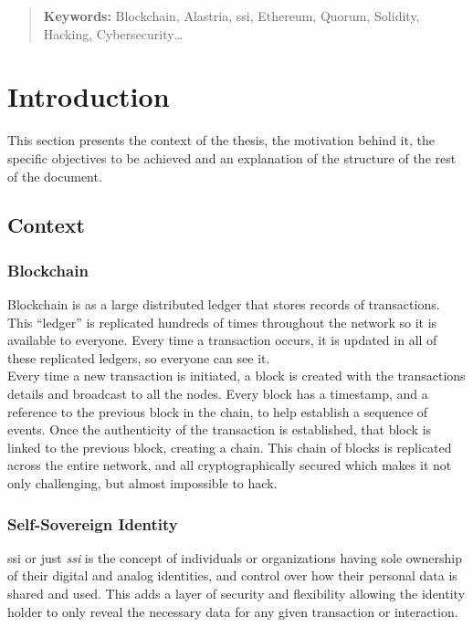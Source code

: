 \documentclass[a4paper, 12pt]{article} %
\begin{document}
\newpage

\begin{abstract}
    \normalsize
    
    \textbf{Keywords:} Blockchain, Alastria, \acrlong{ssi}, Ethereum, Quorum, Solidity, Hacking, Cybersecurity\ldots
\end{abstract}

\newpage
{} %

\section{Introduction}
    This section presents the context of the thesis, the motivation behind it, the specific objectives to be achieved and an explanation of the structure of the rest of the document.
    
    \subsection{Context}
        \subsubsection{Blockchain}
            Blockchain\cite{blockchain-sum}\cite{blockchainGartner} is as a large distributed ledger that stores records of transactions. This “ledger” is replicated hundreds of times throughout the network so it is available to everyone. Every time a transaction occurs, it is updated in all of these replicated ledgers, so everyone can see it.\\
            
            Every time a new transaction is initiated, a block is created with the transactions details and broadcast to all the nodes. Every block has a timestamp, and a reference to the previous block in the chain, to help establish a sequence of events. Once the authenticity of the transaction is established, that block is linked to the previous block, creating a chain. This chain of blocks is replicated across the entire network, and all cryptographically secured which makes it not only challenging, but almost impossible to hack.
            
        \subsubsection{Self-Sovereign Identity}
            \acrlong{ssi} or just \textit{\acrshort{ssi}}\cite{ssi} is the concept of individuals or organizations having sole ownership of their digital and analog identities, and control over how their personal data is shared and used. This adds a layer of security and flexibility allowing the identity holder to only reveal the necessary data for any given transaction or interaction.\\
            
\end{document}
